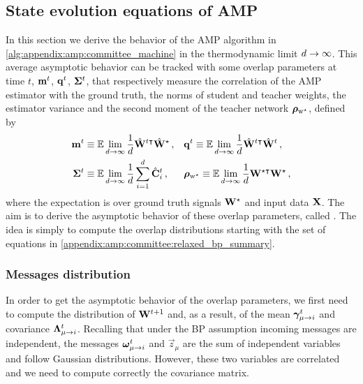 \subsection{State evolution equations of AMP}
\label{appendix:amp:derivation:se_eqs}
In this section we derive the behavior of the AMP algorithm in  \Alg\ref{alg:appendix:amp:committee_machine} in the thermodynamic limit $d \to \infty$. This average asymptotic behavior can be tracked with some overlap parameters at time $t$, ${\mathbf{m}}^t$, ${\mathbf{q}}^t$, ${\boldsymbol{\Sigma}}^t$, that respectively measure the correlation of the AMP estimator with the ground truth, the norms of student and teacher weights, the estimator variance and the second moment of the teacher network $ {\boldsymbol{\rho}}_{{\mathrm{w}}^\star}$, defined by
\begin{align}
\begin{aligned}
	{\mathbf{m}}^t &\equiv \displaystyle \mathbb{E} \lim_{d \to \infty} \frac{1}{d}\hat{{\mathbf{W}}}^{t \intercal} \hat{{\mathbf{W}}}^{\star} \,, 
	&& {\mathbf{q}}^t  \equiv \displaystyle \mathbb{E} \lim_{d \to \infty} \frac{1}{d} \hat{{\mathbf{W}}}^{t \intercal} \hat{{\mathbf{W}}}^{t}  \,, \\ 
	{\boldsymbol{\Sigma}}^t & \equiv \displaystyle \mathbb{E} \lim_{d \to \infty} \frac{1}{d} \sum_{i=1}^d \hat{{\mathbf{C}}}_{i}^{t} \,, &&
	{\boldsymbol{\rho}}_{{\mathrm{w}}^\star} \equiv \displaystyle \mathbb{E} \lim_{d \to \infty} \frac{1}{d} {\mathbf{W}}^{\star \intercal} {\mathbf{W}}^{\star} \,,
\end{aligned}
\label{appendix:amp:derivation:se_eqs:overlaps}
\end{align}
where the expectation is over ground truth signals ${\mathbf{W}}^\star$ and input data ${\mathbf{X}}$. The aim is to derive the asymptotic behavior of these overlap parameters, called . The idea is simply to compute the overlap distributions starting with the set of  equations in \eqref{appendix:amp:committee:relaxed_bp_summary}.

\subsubsection{Messages distribution}
In order to get the asymptotic behavior of the overlap parameters, we first need to compute the distribution of ${\mathbf{W}}^{t+1}$ and, as a result, of the mean ${\boldsymbol{\gamma}}_{\mu \to i}^t$ and covariance ${\boldsymbol{\Lambda}}_{\mu \to i}^t$. 
Recalling that under the BP assumption incoming messages are independent, the messages ${\boldsymbol{\omega}}_{\mu \to i}^t$ and $\vec{z}_{\mu}$ are the sum of independent variables and follow Gaussian distributions. 
However, these two variables are correlated and we need to compute correctly the covariance matrix.

